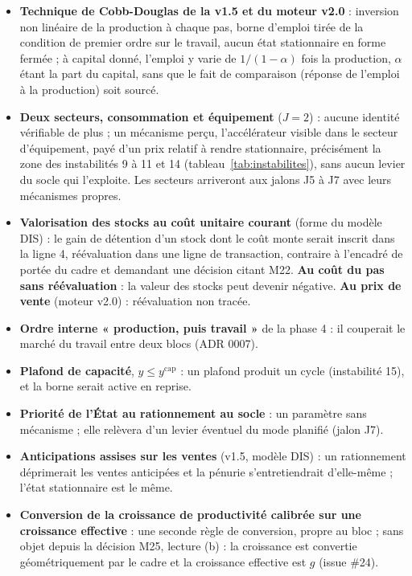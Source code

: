 \documentclass[11pt,a4paper]{article}
\begin{document}
\begin{itemize}
\item \textbf{Technique de Cobb-Douglas de la v1.5 et du moteur v2.0} : inversion non linéaire de la production à chaque pas, borne d'emploi tirée de la condition de premier ordre sur le travail, aucun état stationnaire en forme fermée ; à capital donné, l'emploi y varie de $1/(1 - \alpha)$ fois la production, $\alpha$ étant la part du capital, sans que le fait de comparaison (réponse de l'emploi à la production) soit sourcé.
\item \textbf{Deux secteurs, consommation et équipement} ($J = 2$) : aucune identité vérifiable de plus ; un mécanisme perçu, l'accélérateur visible dans le secteur d'équipement, payé d'un prix relatif à rendre stationnaire, précisément la zone des instabilités 9 à 11 et 14 (tableau~\ref{tab:instabilites}), sans aucun levier du socle qui l'exploite. Les secteurs arriveront aux jalons J5 à J7 avec leurs mécanismes propres.
\item \textbf{Valorisation des stocks au coût unitaire courant} (forme du modèle DIS) : le gain de détention d'un stock dont le coût monte serait inscrit dans la ligne 4, réévaluation dans une ligne de transaction, contraire à l'encadré de portée du cadre et demandant une décision citant M22. \textbf{Au coût du pas sans réévaluation} : la valeur des stocks peut devenir négative. \textbf{Au prix de vente} (moteur v2.0) : réévaluation non tracée.
\item \textbf{Ordre interne « production, puis travail »} de la phase 4 : il couperait le marché du travail entre deux blocs (ADR 0007).
\item \textbf{Plafond de capacité}, $y \le y^{\mathrm{cap}}$ : un plafond produit un cycle (instabilité 15), et la borne serait active en reprise.
\item \textbf{Priorité de l'État au rationnement au socle} : un paramètre sans mécanisme ; elle relèvera d'un levier éventuel du mode planifié (jalon J7).
\item \textbf{Anticipations assises sur les ventes} (v1.5, modèle DIS) : un rationnement déprimerait les ventes anticipées et la pénurie s'entretiendrait d'elle-même ; l'état stationnaire est le même.
\item \textbf{Conversion de la croissance de productivité calibrée sur une croissance effective} : une seconde règle de conversion, propre au bloc ; sans objet depuis la décision M25, lecture (b) : la croissance est convertie géométriquement par le cadre et la croissance effective est $g$ (issue \#24).
\end{itemize}
\end{document}
